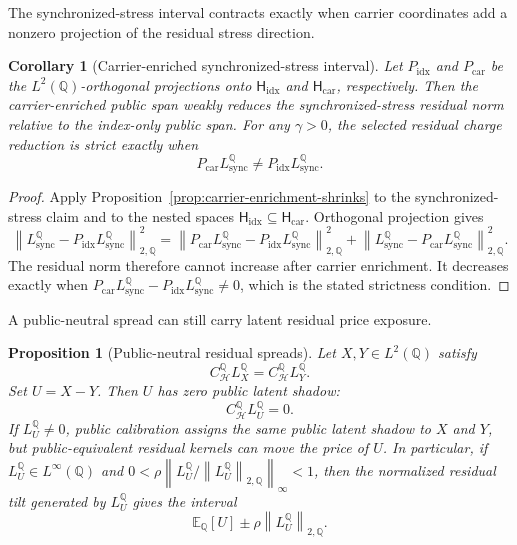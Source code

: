 \documentclass[11pt,a4paper]{amsart}
\theoremstyle{plain}
\newtheorem{proposition}[theorem]{Proposition}
\newtheorem{corollary}[theorem]{Corollary}
\theoremstyle{definition}
\theoremstyle{remark}
\newcommand{\QQ}{\mathbb{Q}}
\newcommand{\EE}{\mathbb{E}}
\newcommand{\cH}{\mathcal{H}}
\newcommand{\norm}[1]{\left\lVert #1\right\rVert}
\begin{document}
The synchronized-stress interval contracts exactly when carrier coordinates add a nonzero
projection of the residual stress direction.

\begin{corollary}[Carrier-enriched synchronized-stress interval]\label{cor:carrier-sync-interval}
Let \(P_{\mathrm{idx}}\) and \(P_{\mathrm{car}}\) be the \(L^2(\QQ)\)-orthogonal projections onto
\(\mathsf H_{\mathrm{idx}}\) and \(\mathsf H_{\mathrm{car}}\), respectively.  Then the
carrier-enriched public span weakly reduces the synchronized-stress residual norm relative to the
index-only public span.  For any \(\gamma>0\), the selected residual charge reduction is strict
exactly when
\[
        P_{\mathrm{car}}L_{\mathrm{sync}}^\QQ
        \ne
        P_{\mathrm{idx}}L_{\mathrm{sync}}^\QQ.
\]
\end{corollary}

\begin{proof}
Apply Proposition~\ref{prop:carrier-enrichment-shrinks} to the synchronized-stress claim and to the
nested spaces \(\mathsf H_{\mathrm{idx}}\subseteq\mathsf H_{\mathrm{car}}\).  Orthogonal projection gives
\[
        \norm{L_{\mathrm{sync}}^\QQ-P_{\mathrm{idx}}L_{\mathrm{sync}}^\QQ}_{2,\QQ}^{2}
        =
        \norm{P_{\mathrm{car}}L_{\mathrm{sync}}^\QQ-P_{\mathrm{idx}}L_{\mathrm{sync}}^\QQ}_{2,\QQ}^{2}
        +
        \norm{L_{\mathrm{sync}}^\QQ-P_{\mathrm{car}}L_{\mathrm{sync}}^\QQ}_{2,\QQ}^{2}.
\]
The residual norm therefore cannot increase after carrier enrichment.  It decreases exactly when
\(P_{\mathrm{car}}L_{\mathrm{sync}}^\QQ-P_{\mathrm{idx}}L_{\mathrm{sync}}^\QQ\ne0\), which is the stated
strictness condition.
\end{proof}

A public-neutral spread can still carry latent residual price exposure.

\begin{proposition}[Public-neutral residual spreads]\label{prop:public-neutral-residual-spread}
Let \(X,Y\in L^2(\QQ)\) satisfy
\[
        C_{\cH}^{\QQ}L_X^\QQ
        =
        C_{\cH}^{\QQ}L_Y^\QQ.
\]
Set \(U=X-Y\).  Then \(U\) has zero public latent shadow:
\[
        C_{\cH}^{\QQ}L_U^\QQ=0.
\]
If \(L_U^\QQ\ne0\), public calibration assigns the same public latent shadow to \(X\) and \(Y\),
but public-equivalent residual kernels can move the price of \(U\).  In particular, if
\(L_U^\QQ\in L^\infty(\QQ)\) and \(0<\rho\norm{L_U^\QQ/\norm{L_U^\QQ}_{2,\QQ}}_\infty<1\), then
the normalized residual tilt generated by \(L_U^\QQ\) gives the interval
\[
        \EE_\QQ[U]\pm \rho\norm{L_U^\QQ}_{2,\QQ}.
\]
\end{proposition}
\end{document}
